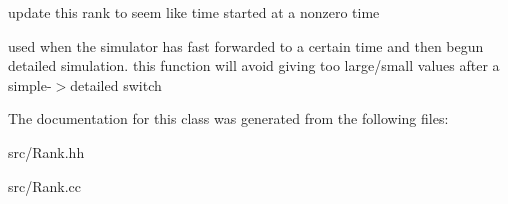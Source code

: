 update this rank to seem like time started at a nonzero time 

used when the simulator has fast forwarded to a certain time and then begun detailed simulation. this function will avoid giving too large/small values after a simple-\/$>$detailed switch 

The documentation for this class was generated from the following files:\begin{DoxyCompactItemize}
\item 
src/Rank.hh\item 
src/Rank.cc\end{DoxyCompactItemize}
